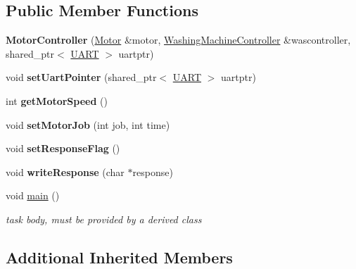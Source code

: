 \subsection*{Public Member Functions}
\begin{DoxyCompactItemize}
\item 
{\bfseries Motor\+Controller} (\hyperlink{class_motor}{Motor} \&motor, \hyperlink{class_washing_machine_controller}{Washing\+Machine\+Controller} \&wascontroller, shared\+\_\+ptr$<$ \hyperlink{class_u_a_r_t}{U\+A\+RT} $>$ uartptr)\hypertarget{class_motor_controller_ae85e7293f0e60d5c7dc1eed1ce7c96ae}{}\label{class_motor_controller_ae85e7293f0e60d5c7dc1eed1ce7c96ae}

\item 
void {\bfseries set\+Uart\+Pointer} (shared\+\_\+ptr$<$ \hyperlink{class_u_a_r_t}{U\+A\+RT} $>$ uartptr)\hypertarget{class_motor_controller_a3fd92144666738d2ecf05b40d1c6b97f}{}\label{class_motor_controller_a3fd92144666738d2ecf05b40d1c6b97f}

\item 
int {\bfseries get\+Motor\+Speed} ()\hypertarget{class_motor_controller_aecc8cb83b9697bc4fd43494d94d7f451}{}\label{class_motor_controller_aecc8cb83b9697bc4fd43494d94d7f451}

\item 
void {\bfseries set\+Motor\+Job} (int job, int time)\hypertarget{class_motor_controller_ac204dff745500f9b8711fd4d7bc68d6d}{}\label{class_motor_controller_ac204dff745500f9b8711fd4d7bc68d6d}

\item 
void {\bfseries set\+Response\+Flag} ()\hypertarget{class_motor_controller_ade1ac6f1cec888d6c6876c74ab0fb4f8}{}\label{class_motor_controller_ade1ac6f1cec888d6c6876c74ab0fb4f8}

\item 
void {\bfseries write\+Response} (char $\ast$response)\hypertarget{class_motor_controller_ae0b037cd1c059650c4cf03fee8c1f317}{}\label{class_motor_controller_ae0b037cd1c059650c4cf03fee8c1f317}

\item 
void \hyperlink{class_motor_controller_acf35f82b30986fb4702933d21eee03ea}{main} ()
\begin{DoxyCompactList}\small\item\em task body, must be provided by a derived class \end{DoxyCompactList}\end{DoxyCompactItemize}
\subsection*{Additional Inherited Members}


